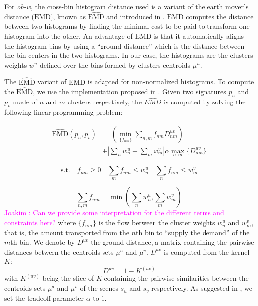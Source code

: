 \documentclass[journal]{IEEEtran}
\newcommand*{\EMD}{\mathrm{EMD}}
\newcommand{\ja}[1]{\textcolor{magenta}{Joakim : #1}}
\begin{document}
For \emph{ob-w}, the cross-bin histogram distance used is a variant of the earth mover's distance ($\EMD$), known as $\widehat{\EMD}$ and introduced in \cite{pele2008linear}. $\EMD$ computes the distance between two histograms by finding the minimal cost to be paid to transform one histogram into the other. An advantage of $\EMD$ is that it automatically aligns the histogram bins by using a ``ground distance'' which is the distance between the bin centers in the two histograms. In our case, the histograms are the clusters weights $w^u$ defined over the bins formed by clusters centroids $\mu^u$.

The $\widehat{\EMD}$ variant of $\EMD$ is adapted for non-normalized histograms. To compute the $\widehat{\EMD}$, we use the implementation proposed in \cite{pele2009fast}. Given two signatures $p_u$ and $p_v$ made of $n$ and $m$ clusters respectively, the $\widehat{EMD}$ is computed by solving the following linear programming problem:

\begin{equation}
\begin{split}
\widehat{\EMD}(p_u,p_v) &=\left( \min\limits_{\lbrace f_{nm}\rbrace} \sum\limits_{n,m} f_{nm}D_{nm}^{uv} \right) \\
&+ \left|\sum\limits_{n} w_n^u - \sum\limits_{m} w_m^v  \right| \alpha \max\limits_{n,m}\lbrace  D_{nm}^{uv}\rbrace
\end{split}
\end{equation}

\begin{equation*}
\mathrm{s.t.} \quad f_{nm}\geq0 \quad \sum\limits_{m} f_{nm} \leq w_n^u \quad \sum\limits_{n} f_{nm} \leq w_m^v
\end{equation*}

\begin{equation*}
\sum\limits_{n,m}f_{nm} = \min\left( \sum\limits_{n} w_n^u ,\sum\limits_{m} w_m^v \right)
\end{equation*} \ja{Can we provide some interpretation for the different terms and constraints here?}
where $\lbrace f_{nm} \rbrace$ is the flow between the cluster weights $w_n^u$ and $w_m^v$, that is, the amount transported from the $n$th bin to ``supply the demand'' of the $m$th bin. We denote by $D^{uv}$ the ground distance, a matrix containing the pairwise distances between the centroids sets $\mu^u$ and $\mu^v$. $D^{uv}$ is computed from the kernel $K$:
\begin{equation*}
D^{uv}=1-K^{(uv)}
\end{equation*}
with $K^{(uv)}$ being the slice of $K$ containing the pairwise similarities between the centroids sets $\mu^u$ and $\mu^v$ of the scenes $s_u$ and $s_v$ respectively. As suggested in \cite{pele2009fast}, we set the tradeoff parameter $\alpha$ to $1$.
\end{document}
